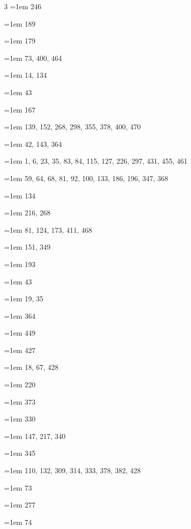 \begin{multicols}{3}
\hangindent=1em  246\par
\hangindent=1em  189\par
\hangindent=1em  179\par
\hangindent=1em  73, 400, 464\par
\hangindent=1em  14, 134\par
\hangindent=1em  43\par
\hangindent=1em  167\par
\hangindent=1em  139, 152, 268, 298, 355, 378, 400, 470\par
\hangindent=1em  42, 143, 364\par
\hangindent=1em  1, 6, 23, 35, 83, 84, 115, 127, 226, 297, 431, 455, 461\par
\hangindent=1em  59, 64, 68, 81, 92, 100, 133, 186, 196, 347, 368\par
\hangindent=1em  134\par
\hangindent=1em  216, 268\par
\hangindent=1em  81, 124, 173, 411, 468\par
\hangindent=1em  151, 349\par
\hangindent=1em  193\par
\hangindent=1em  43\par
\hangindent=1em  19, 35\par
\hangindent=1em  364\par
\hangindent=1em  449\par
\hangindent=1em  427\par
\hangindent=1em  18, 67, 428\par
\hangindent=1em  220\par
\hangindent=1em  373\par
\hangindent=1em  330\par
\hangindent=1em  147, 217, 340\par
\hangindent=1em  345\par
\hangindent=1em  110, 132, 309, 314, 333, 378, 382, 428\par
\hangindent=1em  73\par
\hangindent=1em  277\par
\hangindent=1em  74\par

\end{multicols}
